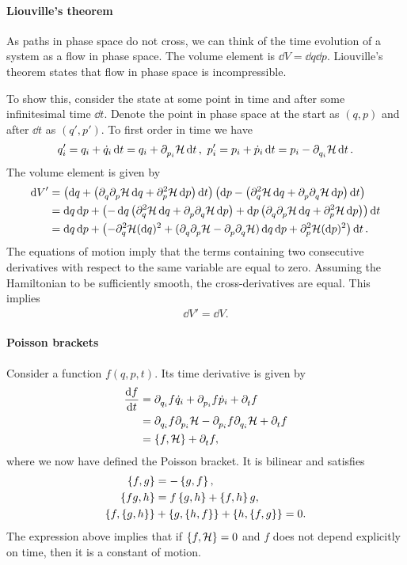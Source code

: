 \paragraph{Liouville's theorem}
As paths in phase space do not cross, we can think of the time evolution of a system as a flow in phase space. The volume element is $\dd{V} = \dd{q}\dd{p}$. Liouville's theorem states that flow in phase space is incompressible.

To show this, consider the state at some point in time and after some infinitesimal time $\dd{t}$. Denote the point in phase space at the start as $(q, p)$ and after $\dd{t}$ as $(q', p').$ To first order in time we have
\begin{align*}
	q_{i}' = q_{i} + \dot{q}_{i}\dd{t} = q_{i} + \del{p_{i}}{\ham}\dd{t},\ p_{i}' = p_{i} + \dot{p}_{i}\dd{t} = p_{i} - \del{q_{i}}{\ham}\dd{t}.
\end{align*}
The volume element is given by
\begin{align*}
	\dd{V}' &= \left(\dd{q} +  \left(\del{q}{\del{p}{\ham}}\dd{q} + \del[2]{p}{\ham}\dd{p}\right)\dd{t}\right)\left(\dd{p} -  \left(\del[2]{q}{\ham}\dd{q} + \del{p}{\del{q}{\ham}}\dd{p}\right)\dd{t}\right) \\
	        &= \dd{q}\dd{p} + \left(-\dd{q}\left(\del[2]{q}{\ham}\dd{q} + \del{p}{\del{q}{\ham}}\dd{p}\right) + \dd{p\left(\del{q}{\del{p}{\ham}}\dd{q} + \del[2]{p}{\ham}\dd{p}\right)}\right)\dd{t} \\
	        &= \dd{q}\dd{p} + \left(-\del[2]{q}{\ham}(\dd{q})^{2} + (\del{q}{\del{p}{\ham}} - \del{p}{\del{q}{\ham}})\dd{q}\dd{p} + \del[2]{p}{\ham}(\dd{p})^{2}\right)\dd{t}.
\end{align*}
The equations of motion imply that the terms containing two consecutive derivatives with respect to the same variable are equal to zero. Assuming the Hamiltonian to be sufficiently smooth, the cross-derivatives are equal. This implies
\begin{align*}
	\dd{V}' = \dd{V}.
\end{align*}

\paragraph{Poisson brackets}
Consider a function $f(q, p, t)$. Its time derivative is given by
\begin{align*}
	\dv{f}{t} &= \del{q_{i}}{f}\dot{q}_{i} + \del{p_{i}}{f}\dot{p}_{i} + \del{t}{f} \\
	          &= \del{q_{i}}{f}\del{p_{i}}{\ham} - \del{p_{i}}{f}\del{q_{i}}{\ham} + \del{t}{f} \\
	          &= \pob{f}{\ham} + \del{t}{f},
\end{align*}
where we now have defined the Poisson bracket. It is bilinear and satisfies
\begin{align*}
	\pob{f}{g}          &= -\pob{g}{f}, \\
	\pob{fg}{h}         &= f\pob{g}{h} + \pob{f}{h}g, \\
	\pob{f}{\pob{g}{h}} &+ \pob{g}{\pob{h}{f}} + \pob{h}{\pob{f}{g}} = 0.
\end{align*}
The expression above implies that if $\pob{f}{\ham} = 0$ and $f$ does not depend explicitly on time, then it is a constant of motion.


